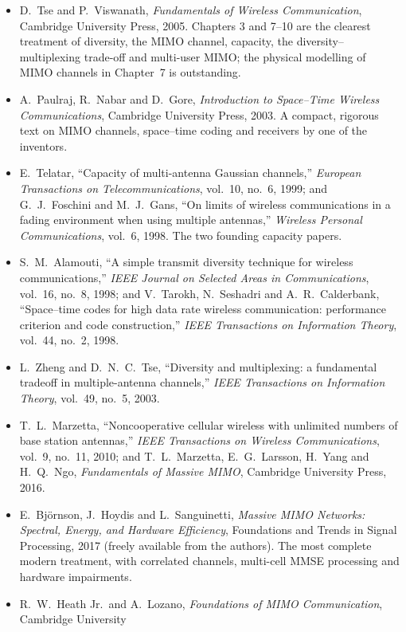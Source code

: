 \furtherreading
\begin{itemize}
\item D.~Tse and P.~Viswanath, \emph{Fundamentals of Wireless Communication}, Cambridge University
Press, 2005. Chapters 3 and 7--10 are the clearest treatment of diversity, the MIMO channel,
capacity, the diversity--multiplexing trade-off and multi-user MIMO; the physical modelling of MIMO
channels in Chapter~7 is outstanding.
\item A.~Paulraj, R.~Nabar and D.~Gore, \emph{Introduction to Space--Time Wireless Communications},
Cambridge University Press, 2003. A compact, rigorous text on MIMO channels, space--time coding and
receivers by one of the inventors.
\item E.~Telatar, ``Capacity of multi-antenna Gaussian channels,'' \emph{European Transactions on
Telecommunications}, vol.~10, no.~6, 1999; and G.~J.~Foschini and M.~J.~Gans, ``On limits of wireless
communications in a fading environment when using multiple antennas,'' \emph{Wireless Personal
Communications}, vol.~6, 1998. The two founding capacity papers.
\item S.~M.~Alamouti, ``A simple transmit diversity technique for wireless communications,''
\emph{IEEE Journal on Selected Areas in Communications}, vol.~16, no.~8, 1998; and V.~Tarokh,
N.~Seshadri and A.~R.~Calderbank, ``Space--time codes for high data rate wireless communication:
performance criterion and code construction,'' \emph{IEEE Transactions on Information Theory},
vol.~44, no.~2, 1998.
\item L.~Zheng and D.~N.~C.~Tse, ``Diversity and multiplexing: a fundamental tradeoff in
multiple-antenna channels,'' \emph{IEEE Transactions on Information Theory}, vol.~49, no.~5, 2003.
\item T.~L.~Marzetta, ``Noncooperative cellular wireless with unlimited numbers of base station
antennas,'' \emph{IEEE Transactions on Wireless Communications}, vol.~9, no.~11, 2010; and
T.~L.~Marzetta, E.~G.~Larsson, H.~Yang and H.~Q.~Ngo, \emph{Fundamentals of Massive MIMO}, Cambridge
University Press, 2016.
\item E.~Bj\"ornson, J.~Hoydis and L.~Sanguinetti, \emph{Massive MIMO Networks: Spectral, Energy, and
Hardware Efficiency}, Foundations and Trends in Signal Processing, 2017 (freely available from the
authors). The most complete modern treatment, with correlated channels, multi-cell MMSE processing
and hardware impairments.
\item R.~W.~Heath Jr.\ and A.~Lozano, \emph{Foundations of MIMO Communication}, Cambridge University

\end{itemize}
